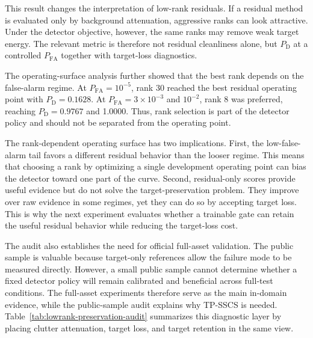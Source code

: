 \documentclass[journal]{IEEEtran}
\begin{document}
This result changes the interpretation of low-rank residuals. If a residual method is evaluated only by background attenuation, aggressive ranks can look attractive. Under the detector objective, however, the same ranks may remove weak target energy. The relevant metric is therefore not residual cleanliness alone, but $P_{\mathrm{D}}$ at a controlled $P_{\mathrm{FA}}$ together with target-loss diagnostics.

The operating-surface analysis further showed that the best rank depends on the false-alarm regime. At $P_{\mathrm{FA}}=10^{-5}$, rank 30 reached the best residual operating point with $P_{\mathrm{D}}=0.1628$. At $P_{\mathrm{FA}}=3 \times 10^{-3}$ and $10^{-2}$, rank 8 was preferred, reaching $P_{\mathrm{D}}=0.9767$ and 1.0000. Thus, rank selection is part of the detector policy and should not be separated from the operating point.

The rank-dependent operating surface has two implications. First, the low-false-alarm tail favors a different residual behavior than the looser regime. This means that choosing a rank by optimizing a single development operating point can bias the detector toward one part of the curve. Second, residual-only scores provide useful evidence but do not solve the target-preservation problem. They improve over raw evidence in some regimes, yet they can do so by accepting target loss. This is why the next experiment evaluates whether a trainable gate can retain the useful residual behavior while reducing the target-loss cost.

The audit also establishes the need for official full-asset validation. The public sample is valuable because target-only references allow the failure mode to be measured directly. However, a small public sample cannot determine whether a fixed detector policy will remain calibrated and beneficial across full-test conditions. The full-asset experiments therefore serve as the main in-domain evidence, while the public-sample audit explains why TP-SSCS is needed. Table~\ref{tab:lowrank-preservation-audit} summarizes this diagnostic layer by placing clutter attenuation, target loss, and target retention in the same view.
\end{document}
